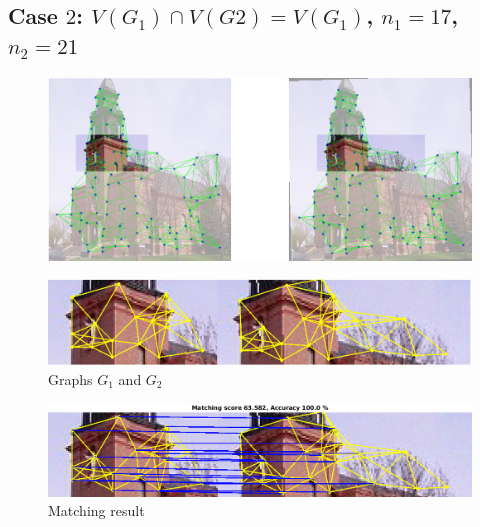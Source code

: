 \documentclass[
	fontsize=12pt,
	paper=a4,
	twoside=false,
	numbers=noenddot,
	plainheadsepline,
	toc=listof,
	toc=bibliography
]{scrartcl}
\begin{document}
\subsection*{ Case $2$: $V(G_1)\cap V(G2) = V(G_1)$, $n_1=17$, $n_2=21$}
\begin{figure} [htb] \centering
	\includegraphics[scale = 0.35]{test2/subregions.png}
\end{figure}
\begin{figure} [hb] \centering
	\includegraphics[scale = 0.4]{test2/subgraphs.png}
	\caption{Graphs $G_1$ and $G_2$}
\end{figure}
\begin{figure} [hb] \centering
	\includegraphics[scale = 0.4]{test2/matching_result.png}
	\caption{ Matching result}
\end{figure}

\FloatBarrier

\newpage
\end{document}
